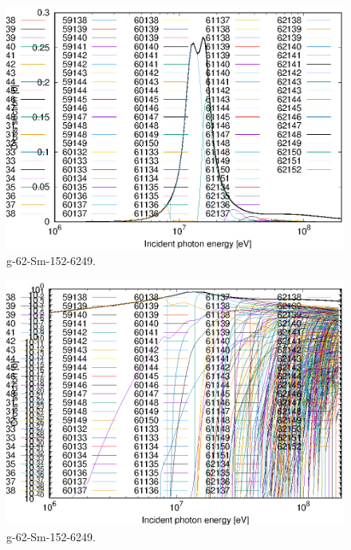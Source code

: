 \begin{figure}
 \includegraphics[width=\linewidth]{eps/g_62-Sm-152_6249.eps}
  \caption{g-62-Sm-152-6249.}
\end{figure}
\begin{figure}
 \includegraphics[width=\linewidth]{eps-log/g_62-Sm-152_6249.eps}
 \caption{g-62-Sm-152-6249.}
\end{figure}
\newpage \clearpage

